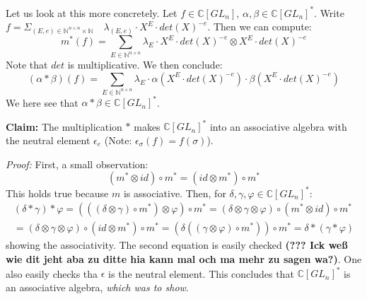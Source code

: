 \documentclass{article}
\begin{document}
Let us look at this more concretely.
Let $f \in \mathbb{C}[GL_n]$, $\alpha,\beta \in \mathbb{C}[GL_n]^\ast$.
Write $f= \Sigma_{\left( E,e \right) \in \mathbb{N}^{n \times n} \times \mathbb{N}} \quad \lambda_{\left( E,e \right)} \cdot X^E \cdot det\left( X \right)^{-e}$.
Then we can compute:
\begin{equation}
  m^\ast \left( f \right) = \sum_{E \in \mathbb{N}^{n \times n}} \lambda_E \cdot X^E \cdot det\left( X \right)^{-e} \otimes X^E \cdot det\left( X \right)^{-e}
\end{equation}
Note that $det$ is multiplicative.
We then conclude:
\begin{equation}
  \left( \alpha \ast \beta \right) \left( f \right) = \sum_{E \in \mathbb{N}^{n \times n} } \lambda_E \cdot \alpha \left( X^E \cdot det\left( X \right)^{-e} \right) \cdot \beta \left( X^E \cdot det\left( X \right)^{-e} \right)
\end{equation}
We here see that $\alpha \ast \beta \in \mathbb{C}[GL_n]^\ast$.

\textbf{Claim:} The multiplication $\ast$ makes $\mathbb{C}[GL_n]^\ast$ into an associative algebra with the neutral element $\epsilon_e$ (Note: $\epsilon_\sigma \left( f \right) = f \left( \sigma \right)$).

\textit{Proof:} First, a small observation:
\begin{equation}
  \left(m^\ast \otimes id \right) \circ m^\ast = \left( id \otimes m^\ast \right) \circ m^\ast
\end{equation}
This holds true because $m$ is associative.
Then, for $\delta, \gamma, \varphi \in \mathbb{C}[GL_n]^\ast$:
\begin{equation}
  \begin{aligned}
  \left( \delta \ast \gamma \right) \ast \varphi
  = \left( \left( \left( \delta \otimes \gamma \right) \circ m^\ast \right) \otimes \varphi \right) \circ m^\ast
  = \left( \delta \otimes \gamma \otimes \varphi \right) \circ \left( m^\ast \otimes id \right) \circ m^\ast \\
  = \left( \delta \otimes \gamma \otimes \varphi \right) \circ \left( id \otimes m^\ast \right) \circ m^\ast
  = \left( \delta \left( \left( \gamma \otimes \varphi \right) \circ m^\ast \right) \right) \circ m^\ast
  = \delta \ast \left( \gamma \ast \varphi \right)
  \end{aligned}
\end{equation}
showing the associativity.
The second equation is easily checked \textbf{(??? Ick we{\ss} wie dit jeht aba zu ditte hia kann mal och ma mehr zu sagen wa?)}.
One also easily checks tha $\epsilon$ is the neutral element. This concludes that $\mathbb{C}[GL_n]^\ast$ is an associative algebra, \textit{which was to show}.
\end{document}
